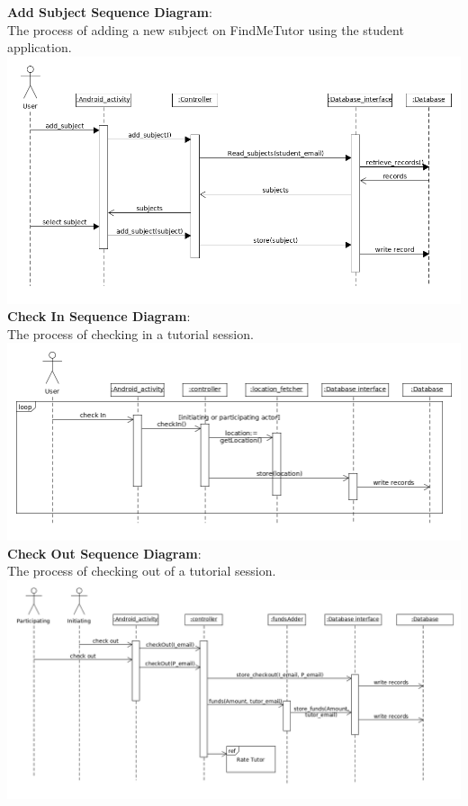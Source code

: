 \documentclass[12pt]{article}
\begin{document}
\newpage
\textbf{Add Subject Sequence Diagram}:\\
The process of adding a new subject on FindMeTutor using the student application.\\
\includegraphics[width=140mm]{./sequence_diagram/add_subject.png}
\newpage
\textbf{Check In Sequence Diagram}:\\
The process of checking in a tutorial session.\\
\includegraphics[width=140mm]{./sequence_diagram/check_in.png}
\newpage
\textbf{Check Out Sequence Diagram}:\\
The process of checking out of a tutorial session.\\
\includegraphics[width=140mm]{./sequence_diagram/check_out.png}
\newpage
\end{document}
